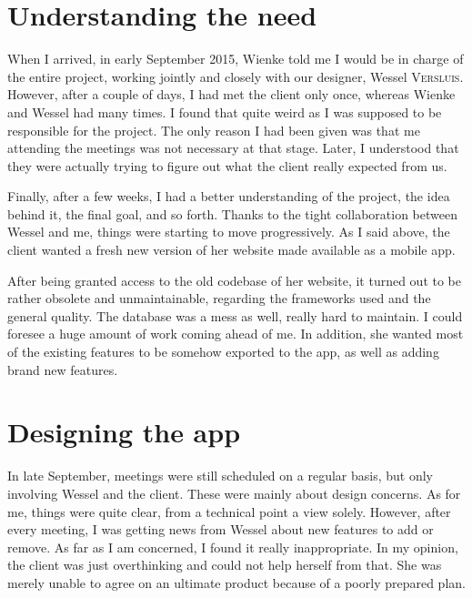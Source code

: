 \section{Understanding the need}

When I arrived, in early September 2015, Wienke told me I would be in charge of the entire project, working jointly and closely with our designer, Wessel \textsc{Versluis}. However, after a couple of days, I had met the client only once, whereas Wienke and Wessel had many times. I found that quite weird as I was supposed to be responsible for the project. The only reason I had been given was that me attending the meetings was not necessary at that stage. Later, I understood that they were actually trying to figure out what the client really expected from us.

\medskip

Finally, after a few weeks, I had a better understanding of the project, the idea behind it, the final goal, and so forth. Thanks to the tight collaboration between Wessel and me, things were starting to move progressively. As I said above, the client wanted a fresh new version of her website made available as a mobile app.

\medskip

After being granted access to the old codebase of her website, it turned out to be rather obsolete and unmaintainable, regarding the frameworks used and the general quality. The database was a mess as well, really hard to maintain. I could foresee a huge amount of work coming ahead of me. In addition, she wanted most of the existing features to be somehow exported to the app, as well as adding brand new features.

\section{Designing the app}

In late September, meetings were still scheduled on a regular basis, but only involving Wessel and the client. These were mainly about design concerns. As for me, things were quite clear, from a technical point a view solely. However, after every meeting, I was getting news from Wessel about new features to add or remove. As far as I am concerned, I found it really inappropriate. In my opinion, the client was just overthinking and could not help herself from that. She was merely unable to agree on an ultimate product because of a poorly prepared plan.

\medskip

